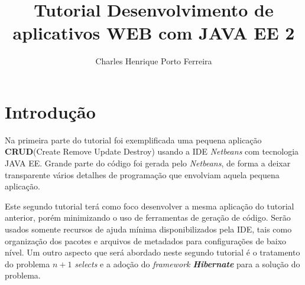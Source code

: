\documentclass[12pt,a4paper]{article}
\author{Charles Henrique Porto Ferreira}
\title{Tutorial Desenvolvimento de aplicativos WEB com JAVA EE 2}
\begin{document}
\onehalfspacing 
\maketitle





\newpage
\tableofcontents

\newpage
\section{Introdução}

Na primeira parte do tutorial foi exemplificada uma pequena aplicação \textbf{CRUD}(Create Remove Update Destroy) usando a IDE \textit{Netbeans} com tecnologia JAVA EE. Grande parte do código foi gerada pelo \textit{Netbeans}, de forma a deixar transparente vários detalhes de programação que envolviam aquela pequena aplicação.

Este segundo tutorial terá como foco desenvolver a mesma aplicação do tutorial anterior, porém  minimizando o uso de ferramentas de geração de código. Serão usados somente recursos de ajuda mínima disponibilizados pela IDE, tais como organização dos pacotes e arquivos de metadados para configurações de baixo nível. Um outro aspecto que será abordado neste segundo tutorial é o tratamento do problema $n+1$ \textit{selects} e a adoção do \textit{framework \textbf{Hibernate}} para a solução do problema.

\newpage
\end{document}
